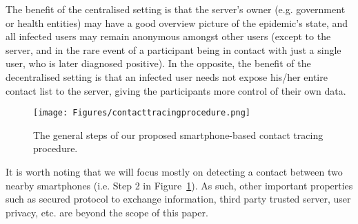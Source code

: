 \documentclass[graybox]{svmult}
\begin{document}
\begin{itemize}
    The benefit of the centralised setting is that the server's owner (e.g. government or health entities) may have a good overview picture of the epidemic's state, and all infected users may remain anonymous amongst other users (except to the server, and in the rare event of a participant being in contact with just a single user, who is later diagnosed positive). In the opposite, the benefit of the decentralised setting is that an infected user needs not expose his/her entire contact list to the server, giving the participants more control of their own data.
\end{itemize}
 
\begin{figure}[h]
    \centering
    \sidecaption
    \texttt{[image: Figures/contacttracingprocedure.png]}
    \caption{The general steps of our proposed smartphone-based contact tracing procedure.}
    \label{contacttracingprocedure}       
\end{figure}

It is worth noting that we will focus mostly on detecting a contact between two nearby smartphones (i.e. Step 2 in Figure~\ref{contacttracingprocedure}). As such, other important properties such as secured protocol to exchange information, third party trusted server, user privacy, etc. are beyond the scope of this paper.


\end{document}
